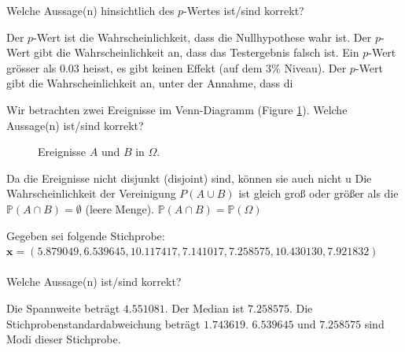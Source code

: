 \documentclass[10pt,addpoints]{exam}
\begin{document}
\begin{questions}
\question Welche Aussage(n) hinsichtlich des $p$-Wertes ist/sind korrekt?\\

\begin{choices}
\choice Der $p$-Wert ist die Wahrscheinlichkeit, dass die Nullhypothese wahr ist.
\choice Der $p$-Wert gibt die Wahrscheinlichkeit an, dass das Testergebnis falsch ist.
\choice Ein $p$-Wert grösser als 0.03 heisst, es gibt keinen Effekt (auf dem 3\% Niveau).
\CorrectChoice Der $p$-Wert gibt die Wahrscheinlichkeit an, unter der Annahme, dass di
\end{choices}

\question Wir betrachten zwei Ereignisse im Venn-Diagramm (Figure \ref{fig:venn_diagram}). 
Welche Aussage(n) ist/sind korrekt?

\begin{figure}[h!]
    \centering
    \caption{Ereignisse \(A\) und \(B\) in \(\Omega\).}
    \label{fig:venn_diagram}
\end{figure}

\begin{choices}
\choice Da die Ereignisse nicht disjunkt (disjoint) sind, können sie auch nicht u
\choice Die Wahrscheinlichkeit der Vereinigung $P(A \cup B)$ ist gleich groß oder größer als die
\choice $\mathbb{P}(A \cap B) = \emptyset$ (leere Menge).
\choice $\mathbb{P}(A \cap B) = \mathbb{P}(\Omega)$
\end{choices}

\question Gegeben sei folgende Stichprobe: $ \mathbf{x} = (5.879049, 6.539645, 10.117417, 7.141017, 7.258575, 10.430130, 7.921832)$\\
\\
Welche Aussage(n) ist/sind korrekt?\\

\begin{choices}
\CorrectChoice Die Spannweite beträgt $4.551081$. 
\CorrectChoice Der Median ist $7.258575$. 
\CorrectChoice Die Stichprobenstandardabweichung beträgt $1.743619$.
\CorrectChoice $6.539645$ und $7.258575$ sind Modi dieser Stichprobe.
\end{choices}


\end{questions}
\end{document}
